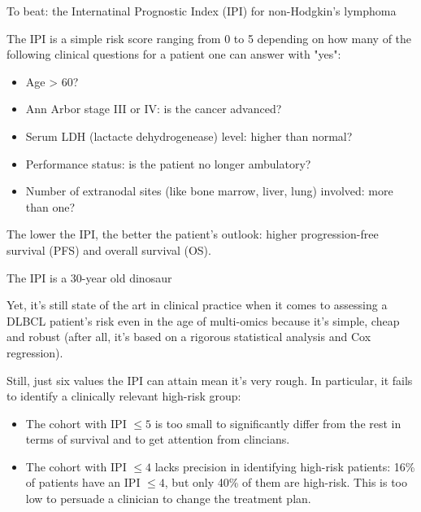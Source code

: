 \documentclass[10pt, aspectratio=169]{beamer}
\begin{document}
\begin{frame}{To beat: the Internatinal Prognostic Index (IPI) for non-Hodgkin's lymphoma}

  The IPI \autocite{ipi93} is a simple risk score ranging from 0 to 5 depending on how many of the following 
  \alert{clinical} questions for a patient one can answer with "yes": 

  \begin{itemize}
    \item Age > 60?
    \item Ann Arbor stage III or IV: is the cancer advanced?
    \item Serum LDH (lactacte dehydrogenease) level: higher than normal?
    \item Performance status: is the patient no longer ambulatory? 
    \item Number of extranodal sites (like bone marrow, liver, lung) involved: more than one?
  \end{itemize}

  The lower the IPI, the better the patient's outlook: higher progression-free survival (PFS) and 
  overall survival (OS).

\end{frame}

\begin{frame}{The IPI is a 30-year old dinosaur}

  Yet, it's still state of the art in clinical practice when it comes to assessing a DLBCL 
  patient's risk even in the age of multi-omics because it's \alert{simple}, \alert{cheap} and 
  \alert{robust} (after all, it's based on a rigorous statistical analysis and Cox regression).

  Still, just six values the IPI can attain mean it's very rough. In particular, it fails 
  to identify a clinically relevant high-risk group:

  \begin{itemize}
    \item The cohort with IPI $\leq 5$ is \alert{too small} to significantly differ from the rest in terms 
    of survival and to get attention from clincians.
    \item The cohort with IPI $\leq 4$ \alert{lacks precision in identifying high-risk patients}: 16\% of
    patients have an IPI $\leq 4$, but only 40\% of them are high-risk. This is too low to persuade 
    a clinician to change the treatment plan.
  \end{itemize}

\end{frame}
\end{document}
